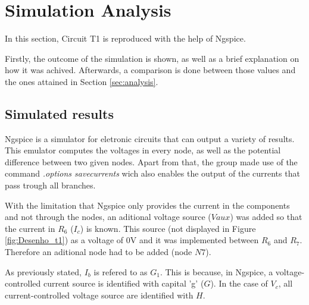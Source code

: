 \section{Simulation Analysis}
\label{sec:simulation}


In this section, Circuit T1 is reproduced with the help of Ngspice.

Firstly, the outcome of the simulation is shown, as well as a brief explanation
on how it was achived. Afterwards, a comparison is done between those values and
the ones attained in Section \ref{sec:analysis}.




\subsection{Simulated results}
\label{subsec:sim_res}



Ngspice is a simulator for eletronic circuits that can output a variety of results.
This emulator computes the voltages in every node, as well as the potential difference
between two given nodes. Apart from that, the group made use of the command
{\em .options savecurrents} wich also enables the output of the currents that pass
trough all branches.

With the limitation that Ngspice only provides the current in the components and not through
the nodes, an aditional voltage source ($Vaux$) was added so that the current in $R_6$ ($I_c$)
is known. This source (not displayed in Figure \ref{fig:Desenho_t1}) as a voltage of 0V and it 
was implemented between $R_6$ and $R_7$. Therefore an aditional node had to be added (node $N7$).

As previously stated, $I_b$ is refered to as $G_1$. This is because, in Ngspice, a
voltage-controlled current source is identified with capital 'g' ($G$). In the case of
$V_c$, all current-controlled voltage source are identified with $H$.

